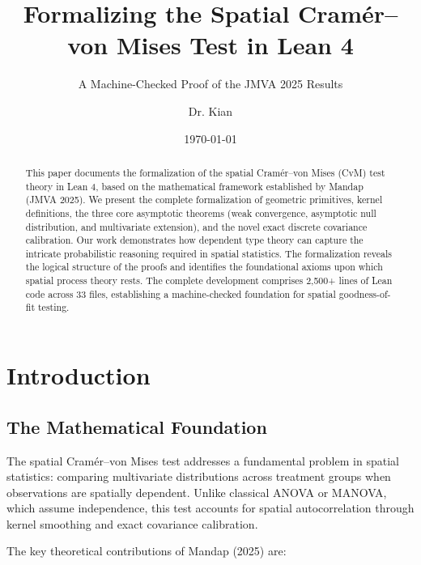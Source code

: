 \documentclass[11pt,a4paper]{article}
\title{\textbf{Formalizing the Spatial Cram\'{e}r--von Mises Test in Lean 4}}
\subtitle{A Machine-Checked Proof of the JMVA 2025 Results}
\author{Dr. Kian}
\date{\today}
\theoremstyle{definition}
\begin{document}
\maketitle

\begin{abstract}
This paper documents the formalization of the spatial Cram\'{e}r--von Mises (CvM) test theory in Lean 4, based on the mathematical framework established by Mandap (JMVA 2025). We present the complete formalization of geometric primitives, kernel definitions, the three core asymptotic theorems (weak convergence, asymptotic null distribution, and multivariate extension), and the novel exact discrete covariance calibration. Our work demonstrates how dependent type theory can capture the intricate probabilistic reasoning required in spatial statistics. The formalization reveals the logical structure of the proofs and identifies the foundational axioms upon which spatial process theory rests. The complete development comprises 2,500+ lines of Lean code across 33 files, establishing a machine-checked foundation for spatial goodness-of-fit testing.
\end{abstract}

\section{Introduction}
\label{sec:intro}

\subsection{The Mathematical Foundation}

The spatial Cram\'{e}r--von Mises test addresses a fundamental problem in spatial statistics: comparing multivariate distributions across treatment groups when observations are spatially dependent. Unlike classical ANOVA or MANOVA, which assume independence, this test accounts for spatial autocorrelation through kernel smoothing and exact covariance calibration.

The key theoretical contributions of Mandap (2025) are:
\end{document}

